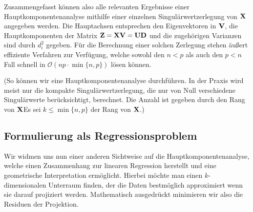 Zusammengefasst können also alle relevanten Ergebnisse einer Hauptkomponentenanalyse mithilfe einer einzelnen Singulärwertzerlegung von $\mathbf{X}$ angegeben werden. Die Hauptachsen entsprechen den Eigenvektoren in $\mathbf{V}$, die Hauptkomponenten der Matrix $\mathbf{Z} = \mathbf{X} \mathbf{V} = \mathbf{U} \mathbf{D}$ und die zugehörigen Varianzen sind durch $d_i^2$ gegeben. Für die Berechnung einer solchen Zerlegung stehen äußert effiziente Verfahren zur Verfügung, welche sowohl den $n<p$ als auch den $p<n$ Fall schnell in $\mathcal{O}(np \cdot \min\{n,p\})$ lösen können. 

(So können wir eine Hauptkomponentenanalyse  durchführen. In der Praxis wird meist nur die kompakte Singulärwertzerlegung, die nur von Null verschiedene Singulärwerte berücksichtigt, berechnet. Die Anzahl ist gegeben durch den Rang von $\mathbf{X}$Es sei $k \leq \min\{n,p\}$ der Rang von $\mathbf{X}$.)

\subsection{Formulierung als Regressionsproblem}

Wir widmen uns nun einer anderen Sichtweise auf die Hauptkomponentenanalyse, welche einen Zusammenhang zur linearen Regression herstellt und eine geometrische Interpretation ermöglicht. Hierbei möchte man einen $k$-dimensionalen Unterraum finden, der die Daten bestmöglich approximiert wenn sie darauf projiziert werden. Mathematisch ausgedrückt minimieren wir also die Residuen der Projektion.

